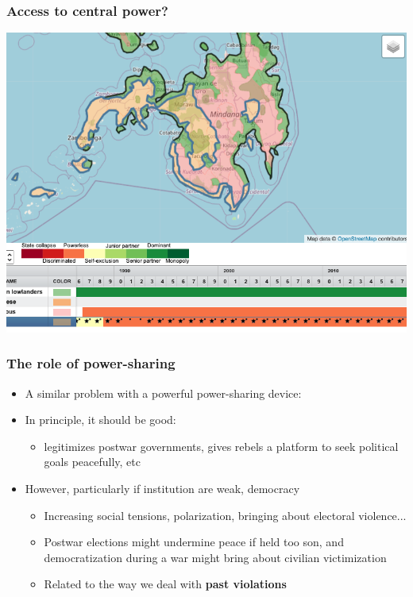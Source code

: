 \documentclass[aspectratio=43]{beamer}
\begin{document}
\begin{frame}
\frametitle{Access to central power?}
\centering

\includegraphics[width = \textwidth]{img/moro_epr}

\end{frame}

\begin{frame}
\frametitle{The role of power-sharing}
\centering

\begin{itemize}[<+->]
  \item A similar problem with a powerful power-sharing device: 
  \item In principle, it should be good:
  \begin{itemize}
    \item legitimizes postwar governments, gives rebels a platform to seek political goals peacefully, etc
  \end{itemize}
  \item However, particularly if institution are weak, democracy 
  \begin{itemize}
    \item Increasing social tensions, polarization, bringing about electoral violence...
    \item Postwar elections might undermine peace if held too son, and democratization during a war might bring about civilian victimization
    \item Related to the way we deal with \textbf{past violations}
  \end{itemize}
\end{itemize}

\end{frame}
\end{document}
